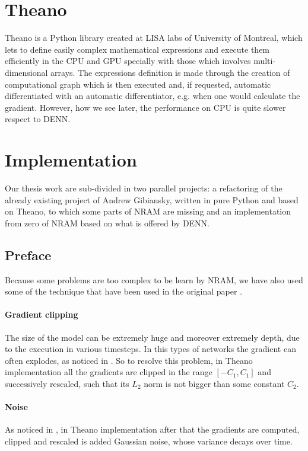 \section{Theano}
Theano is a Python library created at LISA labs of University of Montreal, which lets to define easily complex mathematical expressions and execute them efficiently in the CPU and GPU specially with those which involves multi-dimensional arrays. The expressions definition is made through the creation of computational graph which is then executed and, if requested, automatic differentiated with an automatic differentiator, e.g. when one would calculate the gradient. However, how we see later, the performance on CPU is quite slower respect to DENN.

\section{Implementation}
Our thesis work are sub-divided in two parallel projects: a refactoring of the already existing project of Andrew Gibiansky, written in pure Python and based on Theano, to which some parts of NRAM are missing and an implementation from zero of NRAM based on what is offered by DENN.

\subsection{Preface}
Because some problems are too complex to be learn by NRAM, we have also used some of the technique that have been used in the original paper \cite{NRAM:2016}.

\paragraph{Gradient clipping}
The size of the model can be extremely huge and moreover extremely depth, due to the execution in various timesteps. In this types of networks the gradient can often explodes, as noticed in \cite{Bengio1994LearningLD}. So to resolve this problem, in Theano implementation all the gradients are clipped in the range $[-C_1, C_1]$ and successively rescaled, such that its $L_2$ norm is not bigger than some constant $C_2$.

\paragraph{Noise}
As noticed in \cite{Neelakantan2015AddingGN}, in Theano implementation after that the gradients are computed, clipped and rescaled is added Gaussian noise, whose variance decays over time.

